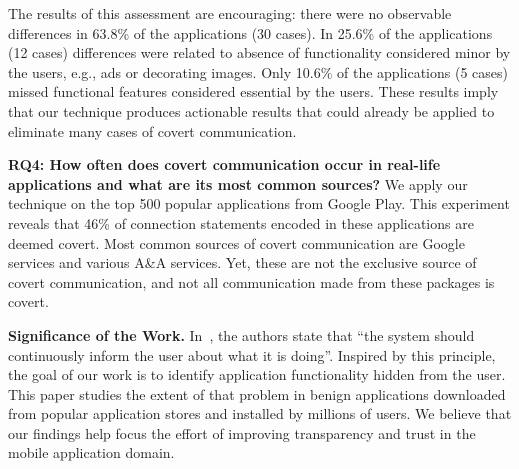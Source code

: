The results of this  assessment are encouraging: there were no observable differences in 63.8\% of the applications (30 cases). In 25.6\% of the applications (12 cases) differences were related to absence of functionality considered minor by the users, e.g., ads or decorating images. Only 10.6\% of the applications (5 cases) missed functional features considered essential by the users. 
These results imply that our technique produces actionable results that could already be applied to eliminate many cases of covert communication. 


\noindent 
{\bf RQ4: How often does covert communication occur in real-life applications and what are its most common sources?}
We apply our technique on the top 500 popular applications from Google Play. This experiment reveals that 46\% of connection statements encoded in these applications 
are deemed covert.
Most common sources of covert communication are Google services %
and various A\&A services. Yet, these are not the exclusive source of covert communication, and not all communication made from these packages is covert. 

%

\noindent 
{\bf Significance of the Work.}  
In~\cite{Nielsen:Molich:CHI90,Blackmon:Polson:Kitajima:Lewis:CHI02,Ko:Zhang:CHI11}, the authors state that  
``the system should continuously inform the user about what it is doing''.
Inspired by this principle, the goal of our work is to identify 
application functionality hidden from the user.
This paper studies the extent of that problem in benign
applications downloaded from popular application stores
and installed by millions of users.
We believe that our findings help focus the effort of improving
transparency and trust in the mobile application domain. 


